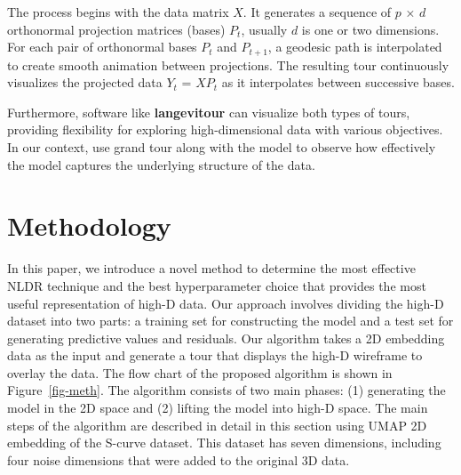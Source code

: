 \documentclass[
  12pt]{article}
\begin{document}
The process begins with the data matrix \(X\). It generates a sequence
of \(p\) × \(d\) orthonormal projection matrices (bases) \(P_t\),
usually \(d\) is one or two dimensions. For each pair of orthonormal
bases \(P_t\) and \(P_{t+1}\), a geodesic path is interpolated to create
smooth animation between projections. The resulting tour continuously
visualizes the projected data \(Y_t\) = \(XP_t\) as it interpolates
between successive bases.

Furthermore, software like \textbf{langevitour} can visualize both types
of tours, providing flexibility for exploring high-dimensional data with
various objectives. In our context, use grand tour along with the model
to observe how effectively the model captures the underlying structure
of the data.

\section{Methodology}\label{sec-methods}

In this paper, we introduce a novel method to determine the most
effective NLDR technique and the best hyperparameter choice that
provides the most useful representation of high-D data. Our approach
involves dividing the high-D dataset into two parts: a training set for
constructing the model and a test set for generating predictive values
and residuals. Our algorithm takes a 2D embedding data as the input and
generate a tour that displays the high-D wireframe to overlay the data.
The flow chart of the proposed algorithm is shown in
Figure~\ref{fig-meth}. The algorithm consists of two main phases: (1)
generating the model in the 2D space and (2) lifting the model into
high-D space. The main steps of the algorithm are described in detail in
this section using UMAP 2D embedding of the S-curve dataset. This
dataset has seven dimensions, including four noise dimensions that were
added to the original 3D data.
\end{document}
